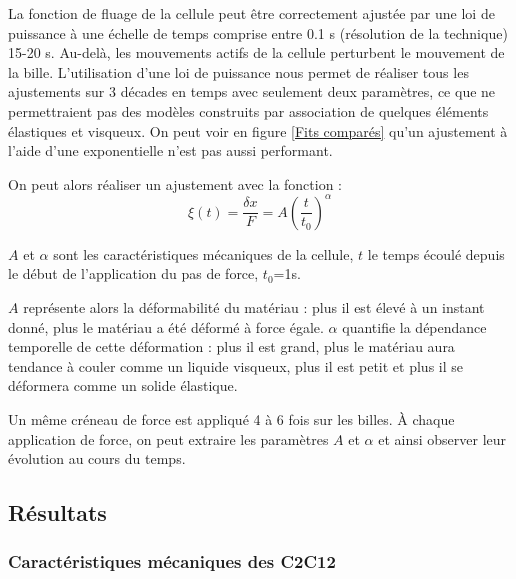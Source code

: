 \documentclass{report}
\begin{document}
La fonction de fluage de la cellule peut être correctement ajustée par une loi de puissance à une échelle de temps comprise entre 0.1 s (résolution de la technique) 15-20 s. Au-delà, les mouvements actifs de la cellule perturbent le mouvement de la bille.  
L'utilisation d'une loi de puissance nous permet de réaliser tous les ajustements sur 3 décades en temps avec seulement deux paramètres, ce que ne permettraient pas des modèles construits par association de quelques éléments élastiques et visqueux. On peut voir en figure \ref{Fits comparés} qu'un ajustement à l'aide d'une exponentielle n'est pas aussi performant. 

On peut alors réaliser un ajustement avec la fonction : 
$$ \xi (t) = \frac{\delta x}{F}=A \left( \frac{t}{t_0} \right)^{\alpha}$$

$A$ et $\alpha$ sont les caractéristiques mécaniques de la cellule, $t$ le temps écoulé depuis le début de l'application du pas de force, $t_0$=1s. 

% 
 
 $A$ représente alors la déformabilité du matériau : plus il est élevé à un instant donné, plus le matériau a été déformé à force égale. 
 $\alpha$ quantifie la dépendance temporelle de cette déformation : plus il est grand, plus le matériau aura tendance à couler comme un liquide visqueux, plus il est petit et plus il se déformera comme un solide élastique. 

Un même créneau de force est appliqué 4 à 6 fois sur les billes. 
À chaque application de force, on peut extraire les paramètres $A$ et $\alpha$ et ainsi observer leur évolution au cours du temps. 


\subsection{Résultats}



\subsubsection{Caractéristiques mécaniques des C2C12}
\end{document}
